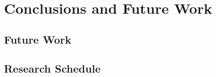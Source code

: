 \newpage
\chapter{Conclusions and Future Work }



\section{Future Work}



\section{Research Schedule}
